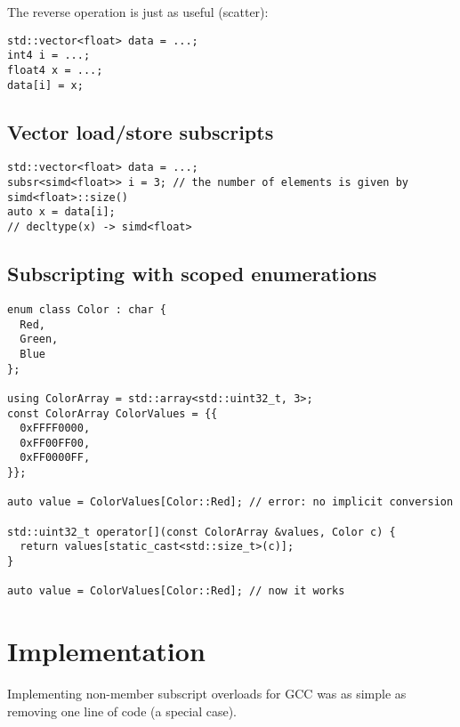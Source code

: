 The reverse operation is just as useful (scatter):
\smallskip\begin{lstlisting}[style=Vc]
std::vector<float> data = ...;
int4 i = ...;
float4 x = ...;
data[i] = x;
\end{lstlisting}

\subsection{Vector load/store subscripts}
\begin{lstlisting}[style=Vc]
std::vector<float> data = ...;
subsr<simd<float>> i = 3; // the number of elements is given by simd<float>::size()
auto x = data[i];
// decltype(x) -> simd<float>
\end{lstlisting}


\subsection{Subscripting with scoped enumerations}

\begin{lstlisting}[style=Vc]
enum class Color : char {
  Red,
  Green,
  Blue
};

using ColorArray = std::array<std::uint32_t, 3>;
const ColorArray ColorValues = {{
  0xFFFF0000,
  0xFF00FF00,
  0xFF0000FF,
}};

auto value = ColorValues[Color::Red]; // error: no implicit conversion

std::uint32_t operator[](const ColorArray &values, Color c) {
  return values[static_cast<std::size_t>(c)];
}

auto value = ColorValues[Color::Red]; // now it works
\end{lstlisting}

\section{Implementation}
Implementing non-member subscript overloads for GCC was as simple as removing one line of code (a special case).

